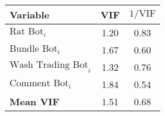 \begin{tabular}{lcc}
\hline
Variable & VIF & $1/\text{VIF}$ \\
\hline
$\text{Rat Bot}_{i}$ & 1.20 & 0.83 \\
$\text{Bundle Bot}_{i}$ & 1.67 & 0.60 \\
$\text{Wash Trading Bot}_{i}$ & 1.32 & 0.76 \\
$\text{Comment Bot}_{i}$ & 1.84 & 0.54 \\
\hline
\textbf{Mean VIF} & 1.51 & 0.68 \\
\hline
\end{tabular}